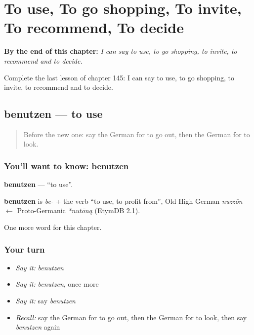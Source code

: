 
\chapter{To use, To go shopping, To invite, To recommend, To decide}
\label{ch:ge-to-use-to-go-shopping-to-invite-to-recommend-to-decide}

\begin{chapteropening}
\textbf{By the end of this chapter:} \emph{I can say to use, to go shopping, to invite, to recommend and to decide.}

Complete the last lesson of chapter 145: I can say to use, to go shopping, to invite, to recommend and to decide.
\end{chapteropening}

\section[benutzen]{benutzen — to use}

\label{lesson:GE-C145-benutzen}



\begin{quote}
Before the new one: say the German for to go out, then the German for to look.
\end{quote}

\subsection*{You'll want to know: benutzen}
\textbf{benutzen} — \textquotedblleft{}to use\textquotedblright{}.

\begin{cousinweb}
\textbf{benutzen} is \emph{be-} + the verb \textquotedblleft{}to use, to profit from\textquotedblright{}, Old High German \emph{nuzzōn} $\leftarrow$ Proto-Germanic \emph{*nutōną} (EtymDB 2.1).
\end{cousinweb}

\begin{grammarlens}[title={What you've built}]
One more word for this chapter.
\end{grammarlens}

\subsection*{Your turn}
\begin{itemize}
\raggedright
  \item \emph{Say it:} \emph{benutzen}
  \item \emph{Say it:} \emph{benutzen}, once more
  \item \emph{Say it:} say \emph{benutzen}
  \item \emph{Recall:} say the German for to go out, then the German for to look, then say \emph{benutzen} again
\end{itemize}

